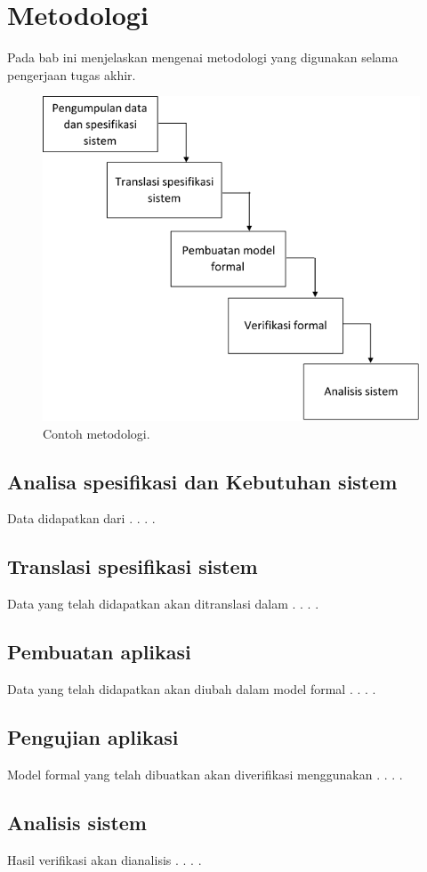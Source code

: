 \chapter{Metodologi}

Pada bab ini menjelaskan mengenai metodologi yang digunakan selama pengerjaan tugas akhir.

\begin{figure}[H]
	\begin{centering}
		\includegraphics[scale=0.7]{metodologi_proposal}
		
		\caption{Contoh metodologi.}
	\end{centering}
\end{figure}

\section{Analisa spesifikasi dan Kebutuhan sistem}

Data didapatkan dari . . . .

\section{Translasi spesifikasi sistem}

Data yang telah didapatkan akan ditranslasi dalam  . . . .

\section{Pembuatan aplikasi}

Data yang telah didapatkan akan diubah dalam model formal . . . .

\section{Pengujian aplikasi}

Model formal yang telah dibuatkan akan diverifikasi menggunakan . . . .

\section{Analisis sistem}

Hasil verifikasi akan dianalisis . . . .
